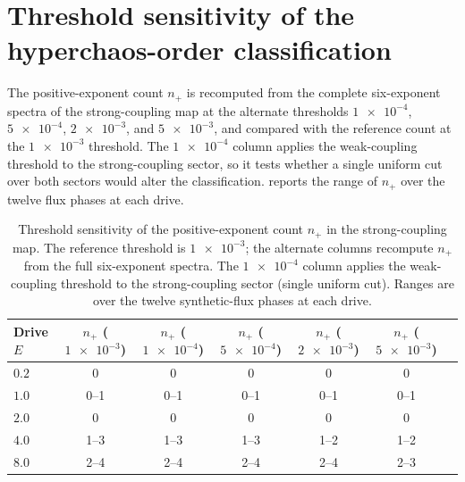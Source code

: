 \documentclass[preprint,numbers,a4paper]{elsarticle}
\begin{document}
\section{Threshold sensitivity of the hyperchaos-order classification}
\label{SI-sec:threshold-sensitivity}

The positive-exponent count $n_{+}$ is recomputed from the complete six-exponent spectra of the strong-coupling map at the alternate thresholds $\num{1e-4}$, $\num{5e-4}$, $\num{2e-3}$, and $\num{5e-3}$, and compared with the reference count at the $\num{1e-3}$ threshold. The $\num{1e-4}$ column applies the weak-coupling threshold to the strong-coupling sector, so it tests whether a single uniform cut over both sectors would alter the classification.  reports the range of $n_{+}$ over the twelve flux phases at each drive.

\begin{table}[h]
  \centering
  \caption{Threshold sensitivity of the positive-exponent count $n_{+}$ in the strong-coupling map. The reference threshold is $\num{1e-3}$; the alternate columns recompute $n_{+}$ from the full six-exponent spectra. The $\num{1e-4}$ column applies the weak-coupling threshold to the strong-coupling sector (single uniform cut). Ranges are over the twelve synthetic-flux phases at each drive.}
  \label{SI-tab:si-threshold-sensitivity}
  \small
  \setlength{\tabcolsep}{4pt}
  \begin{tabular}{@{}lcccccc@{}}
    \toprule
    Drive $E$ & $n_{+}$ ($\num{1e-3}$) & $n_{+}$ ($\num{1e-4}$) & $n_{+}$ ($\num{5e-4}$) & $n_{+}$ ($\num{2e-3}$) & $n_{+}$ ($\num{5e-3}$) \\
    \midrule
    $\num{0.2}$ & 0 & 0 & 0 & 0 & 0 \\
    $\num{1.0}$ & 0--1 & 0--1 & 0--1 & 0--1 & 0--1 \\
    $\num{2.0}$ & 0 & 0 & 0 & 0 & 0 \\
    $\num{4.0}$ & 1--3 & 1--3 & 1--3 & 1--2 & 1--2 \\
    $\num{8.0}$ & 2--4 & 2--4 & 2--4 & 2--4 & 2--3 \\
    \bottomrule
  \end{tabular}
\end{table}
\end{document}
